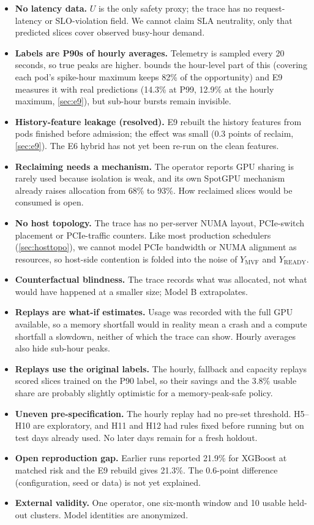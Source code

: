 \documentclass[11pt]{article}
\begin{document}
\begin{itemize}
  \item \textbf{No latency data.} $U$ is the only safety proxy; the trace has no request-latency or SLO-violation field. We cannot claim SLA neutrality, only that predicted slices cover observed busy-hour demand.
  \item \textbf{Labels are P90s of hourly averages.} Telemetry is sampled every 20 seconds, so true peaks are higher.  bounds the hour-level part of this (covering each pod's spike-hour maximum keeps 82\% of the opportunity) and E9 measures it with real predictions (14.3\% at P99, 12.9\% at the hourly maximum, \cref{sec:e9}), but sub-hour bursts remain invisible.
  \item \textbf{History-feature leakage (resolved).} E9 rebuilt the history features from pods finished before admission; the effect was small (0.3 points of reclaim, \cref{sec:e9}). The E6 hybrid has not yet been re-run on the clean features.
  \item \textbf{Reclaiming needs a mechanism.} The operator reports GPU sharing is rarely used because isolation is weak, and its own SpotGPU mechanism already raises allocation from 68\% to 93\%. How reclaimed slices would be consumed is open.
  \item \textbf{No host topology.} The trace has no per-server NUMA layout, PCIe-switch placement or PCIe-traffic counters. Like most production schedulers (\cref{sec:hosttopo}), we cannot model PCIe bandwidth or NUMA alignment as resources, so host-side contention is folded into the noise of $Y_{\text{MVF}}$ and $Y_{\text{READY}}$.
  \item \textbf{Counterfactual blindness.} The trace records what was allocated, not what would have happened at a smaller size; Model B extrapolates.
  \item \textbf{Replays are what-if estimates.} Usage was recorded with the full GPU available, so a memory shortfall would in reality mean a crash and a compute shortfall a slowdown, neither of which the trace can show. Hourly averages also hide sub-hour peaks.
  \item \textbf{Replays use the original labels.} The hourly, fallback and capacity replays scored slices trained on the P90 label, so their savings and the 3.8\% usable share are probably slightly optimistic for a memory-peak-safe policy.
  \item \textbf{Uneven pre-specification.} The hourly replay had no pre-set threshold. H5--H10 are exploratory, and H11 and H12 had rules fixed before running but on test days already used. No later days remain for a fresh holdout.
  \item \textbf{Open reproduction gap.} Earlier runs reported 21.9\% for XGBoost at matched risk and the E9 rebuild gives 21.3\%. The 0.6-point difference (configuration, seed or data) is not yet explained.
  \item \textbf{External validity.} One operator, one six-month window and 10 usable held-out clusters. Model identities are anonymized.
\end{itemize}
\end{document}
